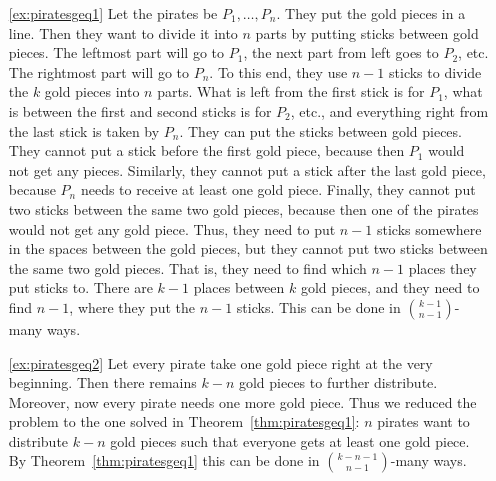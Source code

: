 \begin{enumerate}
\item[\ref{ex:piratesgeq1}]
Let the pirates be $P_1, \dots , P_n$. 
They put the gold pieces in a line. 
Then they want to divide it into $n$ parts by putting sticks between gold pieces. 
The leftmost part will go to $P_1$, 
the next part from left goes to $P_2$, etc. 
The rightmost part will go to $P_n$. 
To this end, they use $n-1$ sticks to divide the $k$ gold pieces into $n$ parts. 
What is left from the first stick is for $P_1$, 
what is between the first and second sticks is for $P_2$, etc., 
and everything right from the last stick is taken by $P_n$. 
They can put the sticks between gold pieces. 
They cannot put a stick before the first gold piece, 
because then $P_1$ would not get any pieces. 
Similarly, they cannot put a stick after the last gold piece, 
because $P_n$ needs to receive at least one gold piece. 
Finally, they cannot put two sticks between the same two gold pieces, 
because then one of the pirates would not get any gold piece.
Thus, they need to put $n-1$ sticks somewhere in the spaces between the gold pieces, 
but they cannot put two sticks between the same two gold pieces. 
That is, they need to find which $n-1$ places they put sticks to. 
There are $k-1$ places between $k$ gold pieces, 
and they need to find $n-1$, where they put the $n-1$ sticks. 
This can be done in $\binom{k-1}{n-1}$-many ways. 

\item[\ref{ex:piratesgeq2}]
Let every pirate take one gold piece right at the very beginning. 
Then there remains $k-n$ gold pieces to further distribute. 
Moreover, now every pirate needs one more gold piece. 
Thus we reduced the problem to the one solved in Theorem~\ref{thm:piratesgeq1}: 
$n$ pirates want to distribute $k-n$ gold pieces such that everyone gets at least one gold piece. 
By Theorem~\ref{thm:piratesgeq1} this can be done in $\binom{k-n-1}{n-1}$-many ways. 


\end{enumerate}
